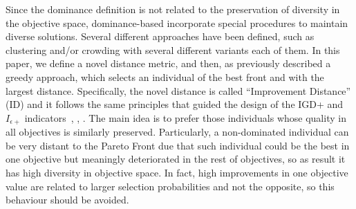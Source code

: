 Since the dominance definition is not related to the preservation of diversity in the objective space,
dominance-based \MOEAS{} incorporate special procedures to maintain diverse solutions.
%
Several different approaches have been defined, such as clustering and/or crowding with several different 
variants each of them.
%
In this paper, we define a novel distance metric, and then, as previously described a greedy approach, which selects an individual of the best front and with the largest distance.
%
Specifically, the novel distance is called ``Improvement Distance'' (ID) and it 
follows the same principles that guided the design of the IGD+ and $I_{\epsilon +}$ indicators~\cite{Joel:Inverted_Generational_Distance_Plus}, \cite{Joel:IBEA}, \cite{zitzler2003performance}.
%
The main idea is to prefer those individuals whose quality in all objectives is similarly preserved.
%
Particularly, a non-dominated individual can be very distant to the Pareto Front due that such individual could be the best in one objective but meaningly deteriorated in the rest of objectives, so as result it has high diversity in objective space.
%
In fact, high improvements in one objective value are related to larger selection probabilities and not the opposite, so this behaviour should be avoided.
%

